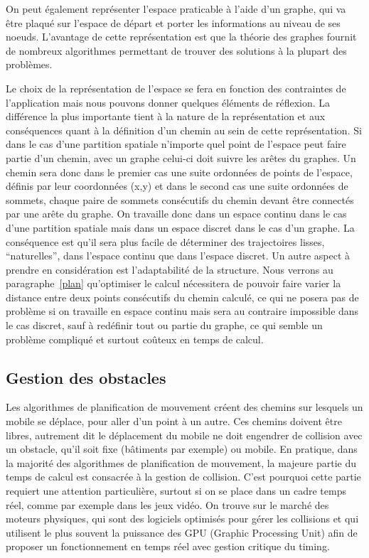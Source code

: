 \documentclass{article}
\begin{document}
On peut également représenter l’espace praticable à l’aide d’un graphe, qui va être plaqué sur l’espace de départ et porter les informations au niveau de ses noeuds. L’avantage de cette représentation est que la théorie des graphes fournit de nombreux algorithmes permettant de trouver des solutions à la plupart des problèmes.

Le choix de la représentation de l’espace se fera en fonction des contraintes de l’application mais nous pouvons donner quelques éléments de réflexion. La différence la plus importante tient à la nature de la représentation et aux conséquences quant à la définition d’un chemin au sein de cette représentation. Si dans le cas d’une partition spatiale n’importe quel point de l’espace peut faire partie d’un chemin, avec un graphe celui-ci doit suivre les arêtes du graphes. Un chemin sera donc dans le premier cas une suite ordonnées de points de l’espace, définis par leur coordonnées (x,y) et dans le second cas une suite ordonnées de sommets, chaque paire de sommets consécutifs du chemin devant être connectés par une arête du graphe. On travaille donc dans un espace continu dans le cas d’une partition spatiale mais dans un espace discret dans le cas d’un graphe. La conséquence est qu’il sera plus facile de déterminer des trajectoires lisses, “naturelles”, dans l’espace continu que dans l’espace discret. Un autre aspect à prendre en considération est l’adaptabilité de la structure. Nous verrons au paragraphe~\ref{plan} qu’optimiser le calcul nécessitera de pouvoir faire varier la distance entre deux points consécutifs du chemin calculé, ce qui ne posera pas de problème si on travaille en espace continu mais sera au contraire impossible dans le cas discret, sauf à redéfinir tout ou partie du graphe, ce qui semble un problème compliqué et surtout coûteux en temps de calcul.

\subsection{Gestion des obstacles}
\label{obstacles}
Les algorithmes de planification de mouvement créent des chemins sur lesquels un mobile se déplace, pour aller d’un point à un autre. Ces chemins doivent être libres, autrement dit le déplacement du mobile ne doit engendrer de collision avec un obstacle, qu’il soit fixe (bâtiments par exemple) ou mobile. En pratique, dans la majorité des algorithmes de planification de mouvement, la majeure partie du temps de calcul est consacrée à la gestion de collision. C’est pourquoi cette partie requiert une attention particulière, surtout si on se place dans un cadre temps réel, comme par exemple dans les jeux vidéo. On trouve sur le marché des moteurs physiques, qui sont des logiciels optimisés pour gérer les collisions et qui utilisent le plus souvent la puissance des GPU (Graphic Processing Unit) afin de proposer un fonctionnement en temps réel avec gestion critique du timing.
\end{document}
